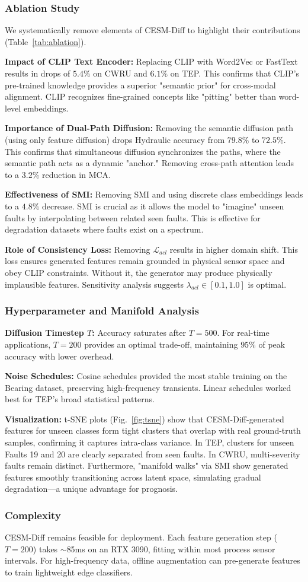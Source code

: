\subsubsection{Ablation Study}
We systematically remove elements of CESM-Diff to highlight their contributions (Table~\ref{tab:ablation}).

\textbf{Impact of CLIP Text Encoder:} Replacing CLIP with Word2Vec or FastText results in drops of $5.4\%$ on CWRU and $6.1\%$ on TEP. This confirms that CLIP’s pre-trained knowledge provides a superior "semantic prior" for cross-modal alignment. CLIP recognizes fine-grained concepts like "pitting" better than word-level embeddings.

\textbf{Importance of Dual-Path Diffusion:} Removing the semantic diffusion path (using only feature diffusion) drops Hydraulic accuracy from $79.8\%$ to $72.5\%$. This confirms that simultaneous diffusion synchronizes the paths, where the semantic path acts as a dynamic "anchor." Removing cross-path attention leads to a $3.2\%$ reduction in MCA.

\textbf{Effectiveness of SMI:} Removing SMI and using discrete class embeddings leads to a $4.8\%$ decrease. SMI is crucial as it allows the model to "imagine" unseen faults by interpolating between related seen faults. This is effective for degradation datasets where faults exist on a spectrum.

\textbf{Role of Consistency Loss:} Removing $\mathcal{L}_{acl}$ results in higher domain shift. This loss ensures generated features remain grounded in physical sensor space and obey CLIP constraints. Without it, the generator may produce physically implausible features. Sensitivity analysis suggests $\lambda_{acl} \in [0.1, 1.0]$ is optimal.

\subsubsection{Hyperparameter and Manifold Analysis}
\textbf{Diffusion Timestep $T$:} Accuracy saturates after $T=500$. For real-time applications, $T=200$ provides an optimal trade-off, maintaining $95\%$ of peak accuracy with lower overhead.

\textbf{Noise Schedules:} Cosine schedules provided the most stable training on the Bearing dataset, preserving high-frequency transients. Linear schedules worked best for TEP's broad statistical patterns.

\textbf{Visualization:} t-SNE plots (Fig.~\ref{fig:tsne}) show that CESM-Diff-generated features for unseen classes form tight clusters that overlap with real ground-truth samples, confirming it captures intra-class variance. In TEP, clusters for unseen Faults 19 and 20 are clearly separated from seen faults. In CWRU, multi-severity faults remain distinct. Furthermore, "manifold walks" via SMI show generated features smoothly transitioning across latent space, simulating gradual degradation—a unique advantage for prognosis.

\subsubsection{Complexity}
CESM-Diff remains feasible for deployment. Each feature generation step ($T=200$) takes $\sim$85ms on an RTX 3090, fitting within most process sensor intervals. For high-frequency data, offline augmentation can pre-generate features to train lightweight edge classifiers.
